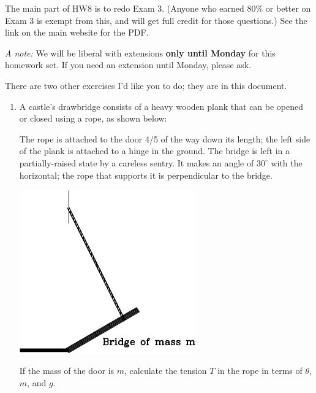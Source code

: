 \documentclass[12pt]{article}
\begin{document}
\Large
\centerline{}
\normalsize
\centerline{}

The main part of HW8 is to redo Exam 3. (Anyone who earned 80\% or better on Exam 3 is exempt from this, and will get full credit for those questions.) See the link on the main website for the PDF.

{\it A note:} We will be liberal with extensions {\bf only until Monday} for this homework set. If you need an extension until Monday, please ask. 


There are two other exercises I'd like you to do; they are in this document.


\begin{enumerate}
	\item   A castle's drawbridge consists of a heavy wooden plank that can be opened or closed using a rope, as shown below:
	
	\begin{minipage}{0.5\textwidth}
		The rope is attached to the door 4/5 of the way down its length; the left side of the plank is attached to a hinge
		in the ground.
		The bridge is left in a partially-raised state by a careless sentry. It makes an angle of $30^\circ$ with the horizontal; the rope that supports it is perpendicular to the
		bridge.
	\end{minipage}
	\begin{minipage}{0.5\textwidth}
		\begin{center}
			\includegraphics[width=0.6\textwidth]{door-crop.pdf}
		\end{center}
		
	\end{minipage}
	\medskip
	
	If the mass of the door is $m$, calculate the tension $T$ in the rope in terms of $\theta$, $m$, and $g$.
	

\end{enumerate}
\end{document}
